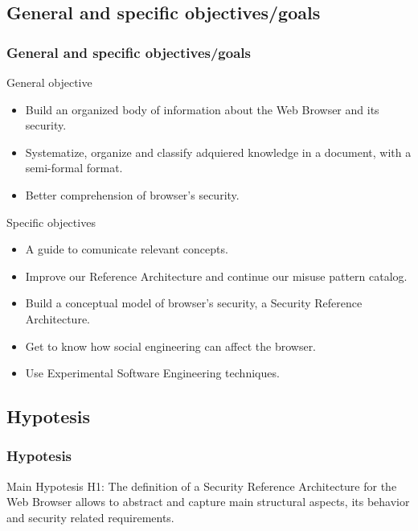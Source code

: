 \documentclass[serif,9pt]{beamer}
\begin{document}
\subsection{General and specific objectives/goals}
\begin{frame}
	\frametitle{General and specific objectives/goals}
	\begin{block}{General objective}
		\begin{small}
		\begin{itemize}
			\item<1-> Build an organized body of information about the Web Browser and its security.
			\item<1-> Systematize, organize and classify adquiered knowledge in a document, with a semi-formal format.
			\item<1-> Better comprehension of browser's security.
		\end{itemize}
		\end{small}
	\end{block}
	\begin{block}{Specific objectives}
		\begin{small}
			\begin{itemize}
				\item<2-> A guide to comunicate relevant concepts.
				\item<2-> Improve our Reference Architecture and continue our misuse pattern catalog. 
				\item<2-> Build a conceptual model of browser's security, a Security Reference Architecture.
				\item<3-> Get to know how social engineering can affect the browser.
				\item<3-> Use Experimental Software Engineering techniques.
			\end{itemize}
		\end{small}
	\end{block}
\end{frame}


\subsection{Hypotesis}
\begin{frame}
	\frametitle{Hypotesis}	
	\begin{block}{Main Hypotesis}
			H1: The definition of a Security Reference Architecture for the Web Browser allows to abstract and capture main structural aspects, its behavior and security related requirements.
	\end{block}
\end{frame}
\end{document}
